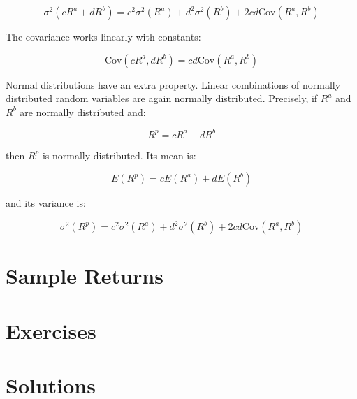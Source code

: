 \begin{equation}
    \sigma^2(cR^a + dR^b) = c^2\sigma^2(R^a) + d^2\sigma^2(R^b) + 2cd\text{Cov}(R^a, R^b)
\end{equation}

The covariance works linearly with constants:

\begin{equation}
    \text{Cov}(cR^a, dR^b) = cd\text{Cov}(R^a, R^b)
\end{equation}

Normal distributions have an extra property. 
Linear combinations of normally distributed random variables 
are again normally distributed. 
Precisely, if $R^a$ and $R^b$ are normally distributed and:

\begin{equation}
    R^p = cR^a + dR^b
\end{equation}

then $R^p$ is normally distributed. Its mean is:

\begin{equation}
    E(R^p) = cE(R^a) + dE(R^b)
\end{equation}

and its variance is:

\begin{equation}
    \sigma^2(R^p) = c^2\sigma^2(R^a) + d^2\sigma^2(R^b) + 2cd\text{Cov}(R^a, R^b)
\end{equation}


\section{Sample Returns}


\section{Exercises}

\section{Solutions}

